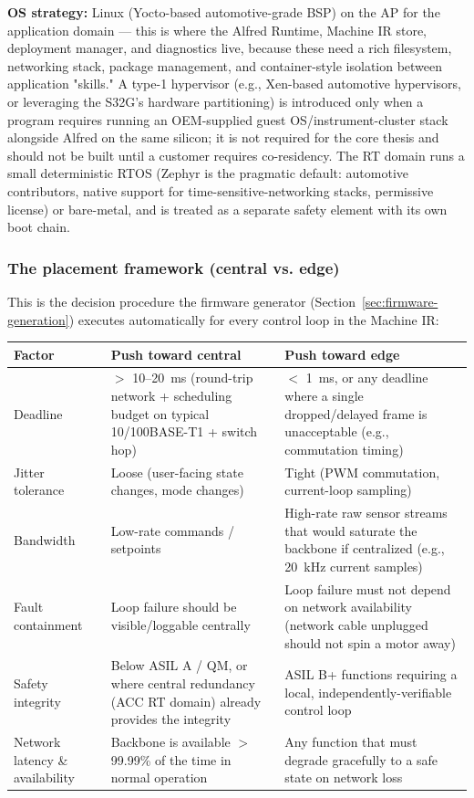 \textbf{OS strategy:} Linux (Yocto-based automotive-grade BSP) on the AP for the application domain --- this is where the Alfred Runtime, Machine IR store, deployment manager, and diagnostics live, because these need a rich filesystem, networking stack, package management, and container-style isolation between application "skills." A type-1 hypervisor (e.g., Xen-based automotive hypervisors, or leveraging the S32G's hardware partitioning) is introduced only when a program requires running an OEM-supplied guest OS/instrument-cluster stack alongside Alfred on the same silicon; it is not required for the core thesis and should not be built until a customer requires co-residency. The RT domain runs a small deterministic RTOS (Zephyr is the pragmatic default: automotive contributors, native support for time-sensitive-networking stacks, permissive license) or bare-metal, and is treated as a separate safety element with its own boot chain.

\subsubsection{The placement framework (central vs. edge)}

This is the decision procedure the firmware generator (Section~\ref{sec:firmware-generation}) executes automatically for every control loop in the Machine IR:

\begin{center}
\small
\begin{tabularx}{\linewidth}{@{}l X X@{}}
\toprule
\textbf{Factor} & \textbf{Push toward central} & \textbf{Push toward edge} \\
\midrule
Deadline & $>$ 10--20~ms (round-trip network + scheduling budget on typical 10/100BASE-T1 + switch hop) & $<$ 1~ms, or any deadline where a single dropped/delayed frame is unacceptable (e.g., commutation timing) \\
Jitter tolerance & Loose (user-facing state changes, mode changes) & Tight (PWM commutation, current-loop sampling) \\
Bandwidth & Low-rate commands / setpoints & High-rate raw sensor streams that would saturate the backbone if centralized (e.g., 20~kHz current samples) \\
Fault containment & Loop failure should be visible/loggable centrally & Loop failure must not depend on network availability (network cable unplugged should not spin a motor away) \\
Safety integrity & Below ASIL A / QM, or where central redundancy (ACC RT domain) already provides the integrity & ASIL B+ functions requiring a local, independently-verifiable control loop \\
Network latency \& availability & Backbone is available $>$99.99\% of the time in normal operation & Any function that must degrade gracefully to a safe state on network loss \\
\bottomrule
\end{tabularx}
\end{center}

